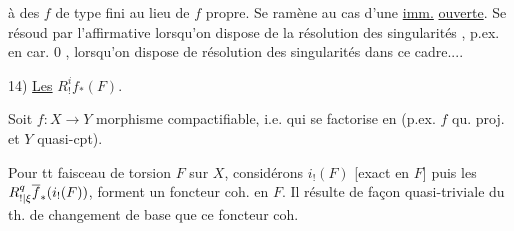 à des $f$ de type fini au lieu de $f$ propre. Se ramène au cas d'une \uline{imm.} \uline{ouverte}. Se résoud par l'affirmative lorsqu'on dispose de la résolution des singularités , p.ex. en car. $0$ ,    lorsqu'on dispose de résolution des singularités  dans ce cadre....

14) \uline{Les} $R^i_!f_*(F)$.

Soit $f:X\to Y$ morphisme compactifiable, i.e. qui se factorise en
(p.ex. $f$ qu. proj. et $Y$ quasi-cpt).

Pour tt faisceau de torsion $F$ sur $X$, considérons $i_!(F)$ [exact en $F$] puis les $R^q_{\relax{\relax{!}|\xi}}\overline f_*(i_!(F))$, forment un foncteur coh. en $F$. Il résulte de façon quasi-triviale du th. de changement de base que ce foncteur coh.
